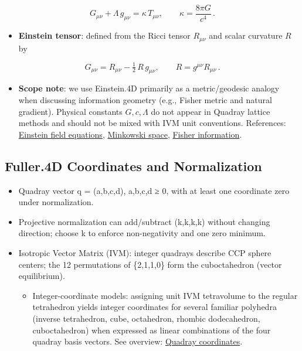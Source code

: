 \documentclass[
  10pt,
]{article}
\providecommand{\tightlist}{%
  \setlength{\itemsep}{0pt}\setlength{\parskip}{0pt}}
\begin{document}
\begin{equation}\label{eq:efe}
G_{\mu \nu} + \Lambda\, g_{\mu \nu} = \kappa\, T_{\mu \nu},\qquad \kappa = \frac{8\pi G}{c^4}\,.
\end{equation}

\begin{itemize}
\tightlist
\item
  \textbf{Einstein tensor}: defined from the Ricci tensor \(R_{\mu\nu}\)
  and scalar curvature \(R\) by
\end{itemize}

\begin{equation}\label{eq:einstein_tensor}
G_{\mu \nu} = R_{\mu \nu} - \tfrac{1}{2}\,R\, g_{\mu \nu},\qquad R = g^{\mu\nu} R_{\mu\nu}\,.
\end{equation}

\begin{itemize}
\tightlist
\item
  \textbf{Scope note}: we use Einstein.4D primarily as a metric/geodesic
  analogy when discussing information geometry (e.g., Fisher metric and
  natural gradient). Physical constants \(G,c,\Lambda\) do not appear in
  Quadray lattice methods and should not be mixed with IVM unit
  conventions. References:
  \href{https://en.wikipedia.org/wiki/Einstein_field_equations}{Einstein
  field equations},
  \href{https://en.wikipedia.org/wiki/Minkowski_space}{Minkowski space},
  \href{https://en.wikipedia.org/wiki/Fisher_information}{Fisher
  information}.
\end{itemize}

\hypertarget{fuller.4d-coordinates-and-normalization}{%
\subsection{Fuller.4D Coordinates and
Normalization}\label{fuller.4d-coordinates-and-normalization}}

\begin{itemize}
\tightlist
\item
  Quadray vector q = (a,b,c,d), a,b,c,d ≥ 0, with at least one
  coordinate zero under normalization.
\item
  Projective normalization can add/subtract (k,k,k,k) without changing
  direction; choose k to enforce non-negativity and one zero minimum.
\item
  Isotropic Vector Matrix (IVM): integer quadrays describe CCP sphere
  centers; the 12 permutations of \{2,1,1,0\} form the cuboctahedron
  (vector equilibrium).

  \begin{itemize}
  \tightlist
  \item
    Integer-coordinate models: assigning unit IVM tetravolume to the
    regular tetrahedron yields integer coordinates for several familiar
    polyhedra (inverse tetrahedron, cube, octahedron, rhombic
    dodecahedron, cuboctahedron) when expressed as linear combinations
    of the four quadray basis vectors. See overview:
    \href{https://en.wikipedia.org/wiki/Quadray_coordinates}{Quadray
    coordinates}.
  \end{itemize}
\end{itemize}
\end{document}
